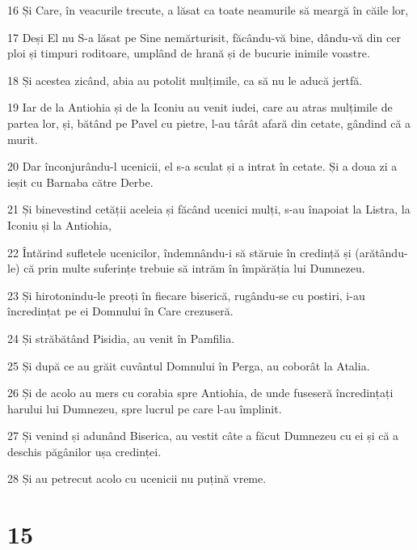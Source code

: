 \par 16 Și Care, în veacurile trecute, a lăsat ca toate neamurile să meargă în căile lor,
\par 17 Deși El nu S-a lăsat pe Sine nemărturisit, făcându-vă bine, dându-vă din cer ploi și timpuri roditoare, umplând de hrană și de bucurie inimile voastre.
\par 18 Și acestea zicând, abia au potolit mulțimile, ca să nu le aducă jertfă.
\par 19 Iar de la Antiohia și de la Iconiu au venit iudei, care au atras mulțimile de partea lor, și, bătând pe Pavel cu pietre, l-au târât afară din cetate, gândind că a murit.
\par 20 Dar înconjurându-l ucenicii, el s-a sculat și a intrat în cetate. Și a doua zi a ieșit cu Barnaba către Derbe.
\par 21 Și binevestind cetății aceleia și făcând ucenici mulți, s-au înapoiat la Listra, la Iconiu și la Antiohia,
\par 22 Întărind sufletele ucenicilor, îndemnându-i să stăruie în credință și (arătându-le) că prin multe suferințe trebuie să intrăm în împărăția lui Dumnezeu.
\par 23 Și hirotonindu-le preoți în fiecare biserică, rugându-se cu postiri, i-au încredințat pe ei Domnului în Care crezuseră.
\par 24 Și străbătând Pisidia, au venit în Pamfilia.
\par 25 Și după ce au grăit cuvântul Domnului în Perga, au coborât la Atalia.
\par 26 Și de acolo au mers cu corabia spre Antiohia, de unde fuseseră încredințați harului lui Dumnezeu, spre lucrul pe care l-au împlinit.
\par 27 Și venind și adunând Biserica, au vestit câte a făcut Dumnezeu cu ei și că a deschis păgânilor ușa credinței.
\par 28 Și au petrecut acolo cu ucenicii nu puțină vreme.

\chapter{15}

